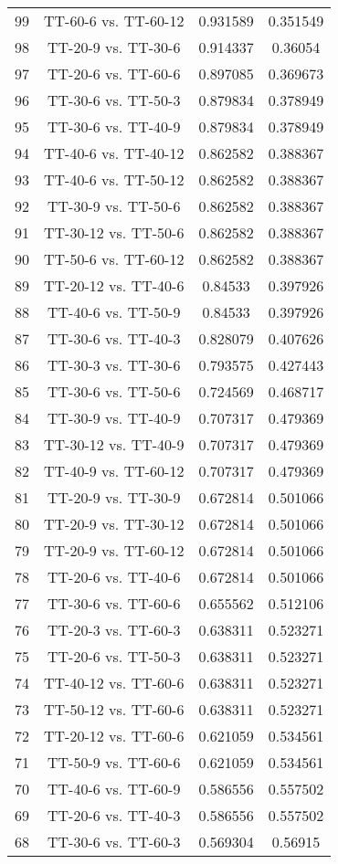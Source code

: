 \documentclass[a4paper,10pt]{article}
\begin{document}
\begin{landscape}
\begin{table}[!htp]
\begin{tabular}{cccc}
99&TT-60-6 vs. TT-60-12&0.931589&0.351549\\
98&TT-20-9 vs. TT-30-6&0.914337&0.36054\\
97&TT-20-6 vs. TT-60-6&0.897085&0.369673\\
96&TT-30-6 vs. TT-50-3&0.879834&0.378949\\
95&TT-30-6 vs. TT-40-9&0.879834&0.378949\\
94&TT-40-6 vs. TT-40-12&0.862582&0.388367\\
93&TT-40-6 vs. TT-50-12&0.862582&0.388367\\
92&TT-30-9 vs. TT-50-6&0.862582&0.388367\\
91&TT-30-12 vs. TT-50-6&0.862582&0.388367\\
90&TT-50-6 vs. TT-60-12&0.862582&0.388367\\
89&TT-20-12 vs. TT-40-6&0.84533&0.397926\\
88&TT-40-6 vs. TT-50-9&0.84533&0.397926\\
87&TT-30-6 vs. TT-40-3&0.828079&0.407626\\
86&TT-30-3 vs. TT-30-6&0.793575&0.427443\\
85&TT-30-6 vs. TT-50-6&0.724569&0.468717\\
84&TT-30-9 vs. TT-40-9&0.707317&0.479369\\
83&TT-30-12 vs. TT-40-9&0.707317&0.479369\\
82&TT-40-9 vs. TT-60-12&0.707317&0.479369\\
81&TT-20-9 vs. TT-30-9&0.672814&0.501066\\
80&TT-20-9 vs. TT-30-12&0.672814&0.501066\\
79&TT-20-9 vs. TT-60-12&0.672814&0.501066\\
78&TT-20-6 vs. TT-40-6&0.672814&0.501066\\
77&TT-30-6 vs. TT-60-6&0.655562&0.512106\\
76&TT-20-3 vs. TT-60-3&0.638311&0.523271\\
75&TT-20-6 vs. TT-50-3&0.638311&0.523271\\
74&TT-40-12 vs. TT-60-6&0.638311&0.523271\\
73&TT-50-12 vs. TT-60-6&0.638311&0.523271\\
72&TT-20-12 vs. TT-60-6&0.621059&0.534561\\
71&TT-50-9 vs. TT-60-6&0.621059&0.534561\\
70&TT-40-6 vs. TT-60-9&0.586556&0.557502\\
69&TT-20-6 vs. TT-40-3&0.586556&0.557502\\
68&TT-30-6 vs. TT-60-3&0.569304&0.56915\\

\end{tabular}
\end{table}
\end{landscape}
\end{document}
